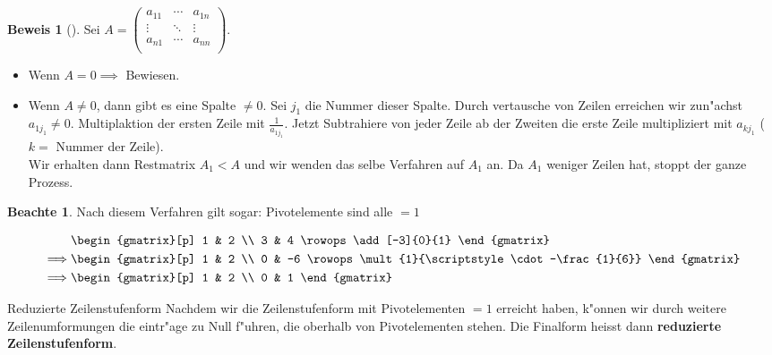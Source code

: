 \documentclass[oneside,fontsize=11pt,paper=a4,BCOR=0mm,DIV=12,automark,headsepline]{scrbook}
\theoremstyle{remark}
\theoremstyle{definition}
\newtheorem*{notte}{Beachte}
\theoremstyle{definition}
\newtheorem*{prof}{Beweis}
\theoremstyle{remark}
\begin{document}
\begin{prof}[]
  Sei \(A=
  \begin{pmatrix}
    a_{11} & \cdots & a_{1n} \\
    \vdots & \ddots & \vdots \\
    a_{n1} & \cdots & a_{nn} \\
    
  \end{pmatrix}\).
  \begin{itemize}
  \item Wenn \(A=0 \implies\) Bewiesen.
  \item Wenn \(A\not=0\), dann gibt es eine Spalte \(\not= 0\). Sei
    \(j_1\) die Nummer dieser Spalte. Durch vertausche von Zeilen erreichen wir
    zun"achst \(a_{1j_1}\not= 0\). Multiplaktion der ersten Zeile mit
    \(\frac{1}{a_{1j_1}}\). Jetzt Subtrahiere von jeder Zeile ab der Zweiten die erste
    Zeile multipliziert mit \(a_{kj_1}\) (\(k=\) Nummer der Zeile).\\
    
    Wir erhalten dann Restmatrix \(A_1<A\) und wir wenden das selbe Verfahren auf
    \(A_1\) an. Da \(A_1\) weniger Zeilen hat, stoppt der ganze Prozess.
  \end{itemize}
  \begin{notte}
    Nach diesem Verfahren gilt sogar: Pivotelemente sind alle \(=1\)
  \end{notte}
\end{prof}


\begin{exa}
  \begin{align*}
    & \begin{gmatrix}[p]
      1 & 2 \\
      3 & 4
      \rowops
      \add[-3]{0}{1}
    \end{gmatrix} \\
    \implies & \begin{gmatrix}[p]
      1 & 2 \\
      0 & -6
      \rowops
      \mult{1}{\scriptstyle\cdot-\frac{1}{6}}
    \end{gmatrix} \\
    \implies & \begin{gmatrix}[p]
      1 & 2 \\
      0 & 1
    \end{gmatrix}
  \end{align*}
\end{exa}

\begin{definition}{Reduzierte Zeilenstufenform}{}
  Nachdem wir die Zeilenstufenform mit Pivotelementen \(=1\) erreicht haben, k"onnen
  wir durch weitere Zeilenumformungen die eintr"age zu Null f"uhren, die oberhalb
  von Pivotelementen stehen. Die Finalform heisst dann \textbf{reduzierte
    Zeilenstufenform}.
\end{definition}
\end{document}
